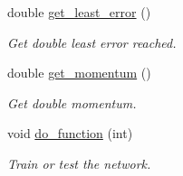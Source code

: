 \begin{DoxyCompactItemize}
double \hyperlink{a00003_a679f8ed0fbaec8037be4145e2667ab36}{get\-\_\-least\-\_\-error} ()
\begin{DoxyCompactList}\small\item\em Get double least error reached. \end{DoxyCompactList}\item 
double \hyperlink{a00003_a8aa33e3c123f800aed4c1e7bdc6339d6}{get\-\_\-momentum} ()
\begin{DoxyCompactList}\small\item\em Get double momentum. \end{DoxyCompactList}\item 
void \hyperlink{a00003_acd3d4762d71d54422b45fda3a13976cf}{do\-\_\-function} (int)
\begin{DoxyCompactList}\small\item\em Train or test the network. \end{DoxyCompactList}\end{DoxyCompactItemize}
